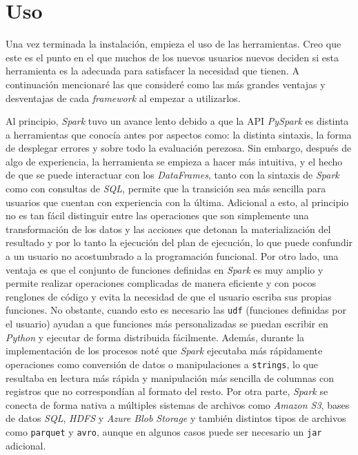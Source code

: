 \section{Uso}

Una vez terminada la instalación, empieza el uso de las herramientas. Creo que este es el punto en el que muchos de los nuevos usuarios nuevos deciden si esta herramienta es la adecuada para satisfacer la necesidad que tienen. A continuación mencionaré las que consideré como las más grandes ventajas y desventajas de cada \textit{framework} al empezar a utilizarlos.

Al principio, \textit{Spark} tuvo un avance lento debido a que la API \textit{PySpark} es distinta a herramientas que conocía antes por aspectos como: la distinta sintaxis, la forma de desplegar errores y sobre todo la evaluación perezosa. Sin embargo, después de algo de experiencia, la herramienta se empieza a hacer más intuitiva, y el hecho de que se puede interactuar con los \textit{DataFrames}, tanto con la sintaxis de \textit{Spark} como con consultas de \textit{SQL}, permite que la transición sea más sencilla para usuarios que cuentan con experiencia con la última. Adicional a esto, al principio no es tan fácil distinguir entre las operaciones que son simplemente una transformación de los datos y las acciones que detonan la materialización del resultado y por lo tanto la ejecución del plan de ejecución, lo que puede confundir a un usuario no acostumbrado a la programación funcional. Por otro lado, una ventaja es que el conjunto de funciones definidas en \textit{Spark} es muy amplio y permite realizar operaciones complicadas de manera eficiente y con pocos renglones de código y evita la necesidad de que el usuario escriba sus propias funciones. No obstante, cuando esto es necesario las \texttt{udf} (funciones definidas por el usuario) ayudan a que funciones más personalizadas se puedan escribir en \textit{Python} y ejecutar de forma distribuida fácilmente. Además, durante la implementación de los procesos noté que \textit{Spark} ejecutaba más rápidamente operaciones como conversión de datos o manipulaciones a \texttt{strings}, lo que resultaba en lectura más rápida y manipulación más sencilla de columnas con registros que no correspondían al formato del resto. Por otra parte, \textit{Spark} se conecta de forma nativa a múltiples sistemas de archivos como \textit{Amazon S3}, bases de datos \textit{SQL}, \textit{HDFS} y \textit{Azure Blob Storage} y también distintos tipos de archivos como \texttt{parquet} y \texttt{avro}, aunque en algunos casos puede ser necesario un \texttt{jar} adicional.

